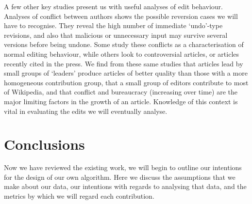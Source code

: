 \documentclass[a4paper,11pt,twoside,notitlepage]{article}
\begin{document}
        A few other key studies present us with useful analyses of
        edit behaviour. Analyses of conflict between authors shows the
        possible reversion cases we will have to recognise. They
        reveal the high number of immediate `undo'-type revisions, and
        also that malicious or unnecessary input may survive several
        versions before being undone. Some study these conflicts as a
        characterisation of normal editing
        behaviour,\cite{Kittur2007}\cite{Kittur2009}\cite{Kittur2010}\cite{Potthast2008}
        while others look to controversial articles,\cite{Iba2010} or
        articles recently cited in the press.\cite{Lih2004} We find
        from these same studies that articles lead by small groups of
        `leaders' produce articles of better quality than those with a
        more homogeneous contribution group, that a small group of
        editors contribute to most of Wikipedia, and that conflict and
        bureaucracy (increasing over time) are the major limiting
        factors in the growth of an article.\cite{Suh2009} Knowledge
        of this context is vital in evaluating the edits we will
        eventually analyse.


        \section{Conclusions}
        Now we have reviewed the existing work, we will begin to
        outline our intentions for the design of our own algorithm. Here
        we discuss the assumptions that we make about our data, our
        intentions with regards to analysing that data, and the
        metrics by which we will regard each contribution.

\end{document}
